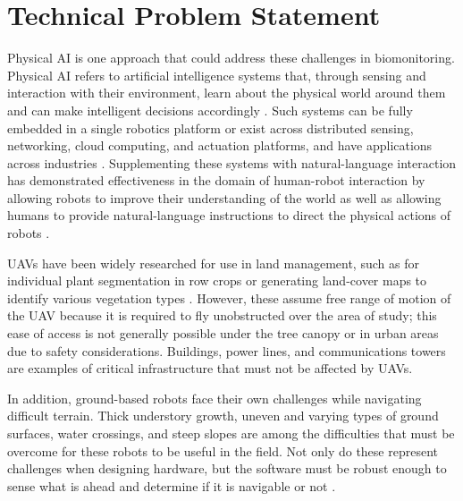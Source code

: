 \documentclass{article}
\begin{document}
\section{Technical Problem Statement}
Physical AI is one approach that could address these challenges in biomonitoring. Physical AI refers to artificial intelligence systems that, through sensing and interaction with their environment, learn about the physical world around them and can make intelligent decisions accordingly \cite{10.1115/1.4070122}. Such systems can be fully embedded in a single robotics platform or exist across distributed sensing, networking, cloud computing, and actuation platforms, and have applications across industries \cite{10.1115/1.4070122}. Supplementing these systems with natural-language interaction has demonstrated effectiveness in the domain of human-robot interaction by allowing robots to improve their understanding of the world \cite{ahn2022icanisay} \cite{brohan2023rt2visionlanguageactionmodelstransfer} as well as allowing humans to provide natural-language instructions to direct the physical actions of robots \cite{ahn2022icanisay}.


UAVs have been widely researched for use in land management, such as for individual plant segmentation in row crops \cite{10161078} or generating land-cover maps to identify various vegetation types \cite{Ahmed19052017}. However, these assume free range of motion of the UAV because it is required to fly unobstructed over the area of study; this ease of access is not generally possible under the tree canopy or in urban areas due to safety considerations. Buildings, power lines, and communications towers are examples of critical infrastructure that must not be affected by UAVs. 

In addition, ground-based robots face their own challenges while navigating difficult terrain. Thick understory growth, uneven and varying types of ground surfaces, water crossings, and steep slopes are among the difficulties that must be overcome for these robots to be useful in the field. Not only do these represent challenges when designing hardware, but the software must be robust enough to sense what is ahead and determine if it is navigable or not \cite{10876033}.
\end{document}

